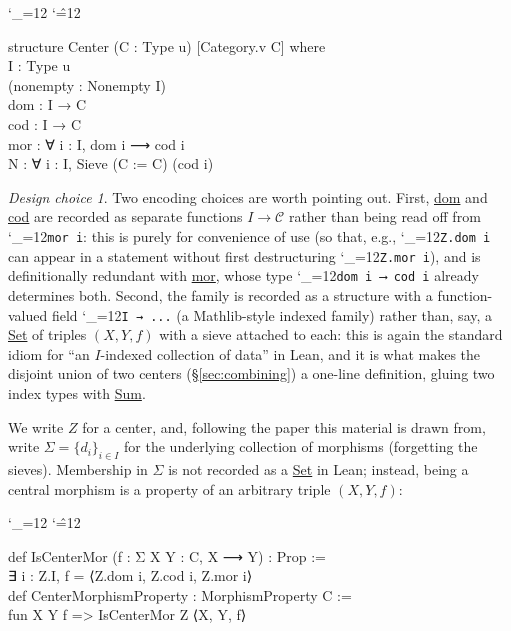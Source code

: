 \documentclass[11pt]{amsart}
\newcommand{\lc}[1]{\url{#1}}
\newcommand{\lcode}{\begingroup\catcode`\_=12\relax\lcodeInner}
\newcommand{\lcodeInner}[1]{\texttt{#1}\endgroup}
\newenvironment{leancode}{%
  \begingroup
  \catcode`\_=12\relax
  \catcode`\^=12\relax
  \small\ttfamily\raggedright\baselineskip=1.15\baselineskip
  \par\smallskip\noindent
}{%
  \par\smallskip
  \endgroup
}
\theoremstyle{plain}
\theoremstyle{definition}
\theoremstyle{remark}
\newtheorem*{designchoice}{Design choice}
\newcommand{\calC}{\mathcal C}
\begin{document}
\begin{leancode}
structure Center (C : Type u) [Category.{v} C] where \\
  I : Type u \\
  (nonempty : Nonempty I) \\
  dom : I → C \\
  cod : I → C \\
  mor : ∀ i : I, dom i ⟶ cod i \\
  N   : ∀ i : I, Sieve (C := C) (cod i) \\
\end{leancode}

\begin{designchoice}
Two encoding choices are worth pointing out. First, \lc{dom} and \lc{cod} are recorded as
separate functions $I \to \calC$ rather than being read off from \lcode{mor i}: this is purely
for convenience of use (so that, e.g., \lcode{Z.dom i} can appear in a statement without
first destructuring \lcode{Z.mor i}), and is definitionally redundant with \lc{mor}, whose type
\lcode{dom i ⟶ cod i} already determines both. Second, the family is
recorded as a structure with a function-valued field \lcode{I → ...} (a Mathlib-style
indexed family) rather than, say, a \lc{Set} of triples $(X,Y,f)$ with a sieve
attached to each: this is again the standard idiom for ``an $I$-indexed collection of
data'' in Lean, and it is what makes the disjoint union of two centers
(\S\ref{sec:combining}) a one-line definition, gluing two index types with
\lc{Sum}.
\end{designchoice}

We write $Z$ for a center, and, following the paper this material is drawn from, write
$\Sigma = \{d_i\}_{i\in I}$ for the underlying collection of morphisms (forgetting the
sieves). Membership in $\Sigma$ is not recorded as a \lc{Set} in Lean; instead, being a
central morphism is a property of an arbitrary triple $(X,Y,f)$:

\begin{leancode}
def IsCenterMor (f : Σ X Y : C, X ⟶ Y) : Prop := \\
  ∃ i : Z.I, f = ⟨Z.dom i, Z.cod i, Z.mor i⟩ \\[0.5\baselineskip]
def CenterMorphismProperty : MorphismProperty C := \\
  fun X Y f => IsCenterMor Z ⟨X, Y, f⟩ \\
\end{leancode}
\end{document}
